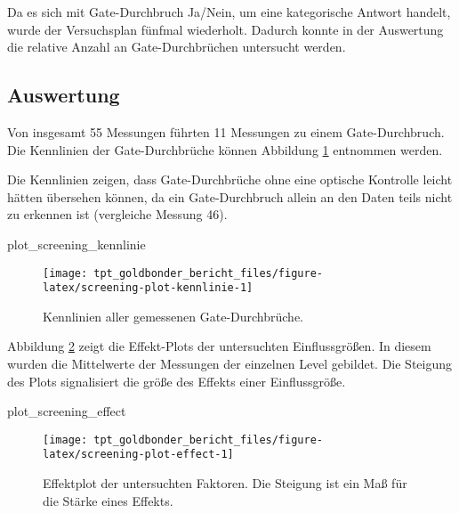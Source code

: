 \documentclass[
  paper=a4,
  ,captions=tableheading
]{scrartcl}
\newenvironment{Shaded}{\begin{snugshade}}{\end{snugshade}}
\newcommand{\NormalTok}[1]{#1}
\begin{document}
Da es sich mit Gate-Durchbruch Ja/Nein, um eine kategorische Antwort handelt, wurde der Versuchsplan fünfmal wiederholt. Dadurch konnte in der Auswertung die relative Anzahl an Gate-Durchbrüchen untersucht werden.

\hypertarget{auswertung}{%
\subsection{Auswertung}\label{auswertung}}

Von insgesamt 55 Messungen führten 11 Messungen zu einem Gate-Durchbruch. Die Kennlinien der Gate-Durchbrüche können Abbildung \ref{fig:screening-plot-kennlinie} entnommen werden.

Die Kennlinien zeigen, dass Gate-Durchbrüche ohne eine optische Kontrolle leicht hätten übersehen können, da ein Gate-Durchbruch allein an den Daten teils nicht zu erkennen ist (vergleiche Messung 46).

\begin{Shaded}
\begin{Highlighting}[]
\NormalTok{plot_screening_kennlinie}
\end{Highlighting}
\end{Shaded}

\begin{figure}

{\centering \texttt{[image: tpt\_goldbonder\_bericht\_files/figure-latex/screening-plot-kennlinie-1]} 

}

\caption{Kennlinien aller gemessenen Gate-Durchbrüche.}\label{fig:screening-plot-kennlinie}
\end{figure}

Abbildung \ref{fig:screening-plot-effect} zeigt die Effekt-Plots der untersuchten Einflussgrößen. In diesem wurden die Mittelwerte der Messungen der einzelnen Level gebildet. Die Steigung des Plots signalisiert die größe des Effekts einer Einflussgröße.

\begin{Shaded}
\begin{Highlighting}[]
\NormalTok{plot_screening_effect}
\end{Highlighting}
\end{Shaded}

\begin{figure}

{\centering \texttt{[image: tpt\_goldbonder\_bericht\_files/figure-latex/screening-plot-effect-1]} 

}

\caption{Effektplot der untersuchten Faktoren. Die Steigung ist ein Maß für die Stärke eines Effekts.}\label{fig:screening-plot-effect}
\end{figure}
\end{document}
